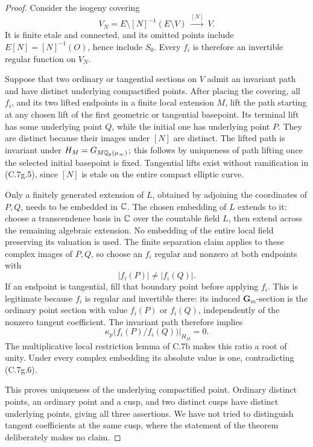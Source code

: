 \begin{proof}
Consider the isogeny covering
\[
 V_N=E\setminus[N]^{-1}(E\setminus V)
                  \ \xrightarrow{[N]}\ V.                 \tag{C.7g.5}
\]
It is finite etale and connected, and its omitted points include
$E[N]=[N]^{-1}(O)$, hence include $S_0$. Every $f_i$ is therefore
an invertible regular function on $V_N$.

Suppose that two ordinary or tangential sections on $V$ admit an
invariant path and have distinct underlying compactified points.
After placing the covering, all $f_i$, and its two lifted endpoints
in a finite local extension $M$, lift the path starting at any
chosen lift of the first geometric or tangential basepoint. Its
terminal lift has some underlying point $Q$, while the initial
one has underlying point $P$. They are distinct because their
images under $[N]$ are distinct. The lifted path is invariant
under $H_M=G_{M\mathbb Q_p(\mu_\infty)}$; this follows by uniqueness of
path lifting once the selected initial basepoint is fixed.
Tangential lifts exist without ramification in (C.7g.5), since
$[N]$ is etale on the entire compact elliptic curve.

Only a finitely generated extension of $L$, obtained by adjoining
the coordinates of $P,Q$, needs to be embedded in $\mathbb C$.
The chosen embedding of $L$ extends to it: choose a transcendence
basis in $\mathbb C$ over the countable field $L$, then extend across the
remaining algebraic extension. No embedding of the entire local
field preserving its valuation is used. The finite separation
claim applies to these complex images of $P,Q$, so choose an $f_i$
regular and nonzero at both endpoints with
\[
                              |f_i(P)|\ne|f_i(Q)|.           \tag{C.7g.6}
\]
If an endpoint is tangential, fill that boundary point before
applying $f_i$. This is legitimate because $f_i$ is regular and
invertible there: its induced $\mathbf G_m$-section is the ordinary
point section with value $f_i(P)$ or $f_i(Q)$, independently of the
nonzero tangent coefficient. The invariant path therefore implies
\[
        \kappa_p\bigl(f_i(P)/f_i(Q)\bigr)|_{H_M}=0.
\]
The multiplicative local restriction lemma of C.7b makes this
ratio a root of unity. Under every complex embedding its absolute
value is one, contradicting (C.7g.6).

This proves uniqueness of the underlying compactified point.
Ordinary distinct points, an ordinary point and a cusp, and two
distinct cusps have distinct underlying points, giving all three
assertions. We have not tried to distinguish tangent coefficients
at the same cusp, where the statement of the theorem deliberately
makes no claim.


\end{proof}
